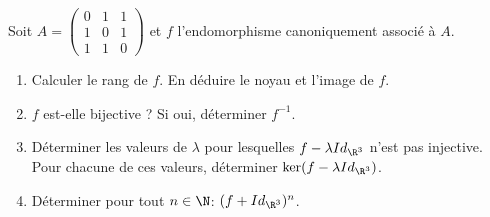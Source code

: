 \documentclass[a4paper, 11pt,reqno]{article}
\begin{document}
\begin{exercice}  \;
	Soit $A=\left(\begin{array}{lll}  0&1&1\\ 1&0&1\\ 1&1&0 \end{array}\right)$ et $f$ l'endomorphisme canoniquement associ\'e \`a $A$.
	\begin{enumerate}
		\item Calculer le rang de $f$. En d\'eduire le noyau et l'image de $f$.
		\item $f$ est-elle bijective ? Si oui, d\'eterminer $f^{-1}$.
		\item D\'eterminer les valeurs de $\lambda$ pour lesquelles $f-\lambda Id_{\R^3}$ n'est pas injective. Pour chacune de ces valeurs, d\'eterminer $\ker (f-\lambda Id_{\R^3})$.
		\item D\'eterminer pour tout $n\in\N$: $(f+Id_{\R^3})^n$.
	\end{enumerate}
\end{exercice}
\end{document}
